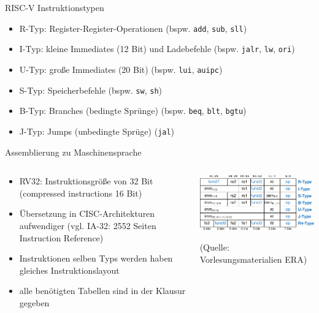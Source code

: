 \documentclass[
  german,            %
  aspectratio=169,    %
]{tumbeamer}
\begin{document}
\begin{frame}[c, fragile]{RISC-V Instruktionstypen}{}
	\begin{itemize}
		\item R-Typ: Register-Register-Operationen (bspw. \texttt{add}, \texttt{sub}, \texttt{sll})
		\item I-Typ: kleine Immediates (12 Bit) und Ladebefehle (bspw. \texttt{jalr}, \texttt{lw}, \texttt{ori})
		\item U-Typ: große Immediates (20 Bit) (bspw. \texttt{lui}, \texttt{auipc})
		\item S-Typ: Speicherbefehle (bspw. \texttt{sw}, \texttt{sh})
		\item B-Typ: Branches (bedingte Sprünge) (bspw. \texttt{beq}, \texttt{blt}, \texttt{bgtu})
		\item J-Typ: Jumps (unbedingte Sprüge) (\texttt{jal})
	\end{itemize}
\end{frame}

\begin{frame}[c, fragile]{Assemblierung zu Maschinensprache}{}
	\begin{columns}[c]
		\begin{column}{0.5\textwidth}
			\begin{itemize}
				\item RV32: Instruktionsgröße von 32 Bit (compressed instructions 16 Bit)
				\item Übersetzung in CISC-Architekturen aufwendiger (vgl. IA-32: 2552 Seiten Instruction Reference)
				\item Instruktionen selben Typs werden haben gleiches Instruktionslayout
				\item alle benötigten Tabellen sind in der Klausur gegeben
			\end{itemize}
		\end{column}
		\begin{column}{0.5\textwidth}
			\begin{center}
				\includegraphics[width=\textwidth]{w08_risc_v_types.pdf}\\
			\end{center}
			\centering
			\tiny (Quelle: Vorlesungsmaterialien ERA)
		\end{column}
	\end{columns}
\end{frame}
\end{document}
